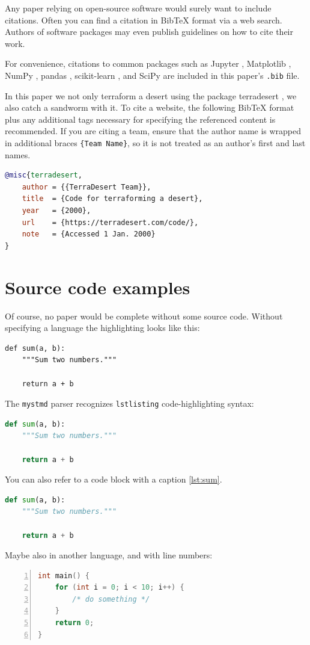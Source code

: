 Any paper relying on open-source software would surely want to include citations.
Often you can find a citation in BibTeX format via a web search.
Authors of software packages may even publish guidelines on how to cite their work.


For convenience, citations to common packages such as
Jupyter \citep{jupyter},
Matplotlib \citep{matplotlib},
NumPy \citep{numpy},
pandas \citep{pandas1,pandas2},
scikit-learn \citep{sklearn1,sklearn2}, and
SciPy \citep{scipy}
are included in this paper's \texttt{.bib} file.

In this paper we not only terraform a desert using the package terradesert \citep{terradesert}, we also catch a sandworm with it.
To cite a website, the following BibTeX format plus any additional tags necessary for specifying the referenced content is recommended.
If you are citing a team, ensure that the author name is wrapped in additional braces \texttt{\{Team Name\}}, so it is not treated as an author's first and last names.

\begin{lstlisting}[language=bibtex]
@misc{terradesert,
    author = {{TerraDesert Team}},
    title  = {Code for terraforming a desert},
    year   = {2000},
    url    = {https://terradesert.com/code/},
    note   = {Accessed 1 Jan. 2000}
}
\end{lstlisting}


\section{Source code examples}\label{source-code-examples}

Of course, no paper would be complete without some source code.
Without specifying a language the highlighting looks like this:

\begin{verbatim}
def sum(a, b):
    """Sum two numbers."""

    return a + b
\end{verbatim}

The \texttt{mystmd} parser recognizes \texttt{lstlisting} code-highlighting syntax:

\begin{lstlisting}[language=Python]
def sum(a, b):
    """Sum two numbers."""

    return a + b
\end{lstlisting}
You can also refer to a code block with a caption \autoref{lst:sum}.
\begin{lstlisting}[label=lst:sum,language=Python,caption=Example Python Code]
def sum(a, b):
    """Sum two numbers."""

    return a + b
\end{lstlisting}
Maybe also in another language, and with line numbers:
\begin{lstlisting}[language=c,numbers=left]
int main() {
    for (int i = 0; i < 10; i++) {
        /* do something */
    }
    return 0;
}
\end{lstlisting}

